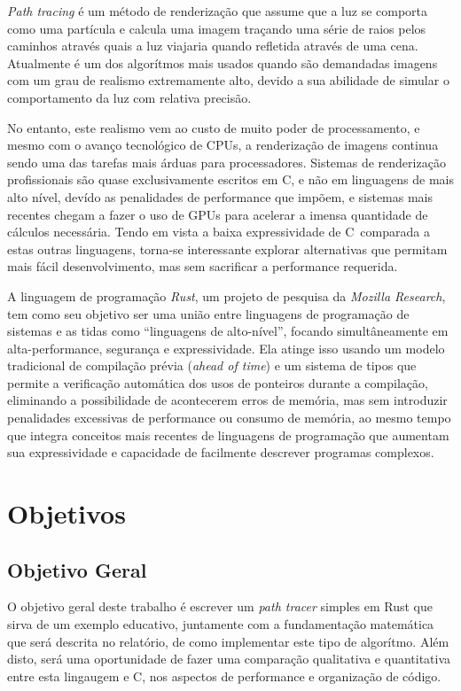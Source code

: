 \documentclass[12pt]{article}
\def\Cpp{{C\nolinebreak[4]\raisebox{.20ex}{\small\bf++}}}
\begin{document}
\emph{Path tracing} é um método de renderização que assume que a luz se comporta como uma partícula
e calcula uma imagem traçando uma série de raios pelos caminhos através quais a luz viajaria quando
refletida através de uma cena. Atualmente é um dos algorítmos mais usados quando são demandadas
imagens com um grau de realismo extremamente alto, devido a sua abilidade de simular o comportamento
da luz com relativa precisão.

No entanto, este realismo vem ao custo de muito poder de processamento, e mesmo com o avanço
tecnológico de CPUs, a renderização de imagens continua sendo uma das tarefas mais árduas para
processadores. Sistemas de renderização profissionais são quase exclusivamente escritos em \Cpp, e
não em linguagens de mais alto nível, devído as penalidades de performance que impõem, e sistemas
mais recentes chegam a fazer o uso de GPUs para acelerar a imensa quantidade de cálculos necessária.
Tendo em vista a baixa expressividade de \Cpp\ comparada a estas outras linguagens, torna-se
interessante explorar alternativas que permitam mais fácil desenvolvimento, mas sem sacrificar a
performance requerida.

A linguagem de programação \emph{Rust}, um projeto de pesquisa da \emph{Mozilla Research}, tem como
seu objetivo ser uma união entre linguagens de programação de sistemas e as tidas como ``linguagens
de alto-nível'', focando simultâneamente em alta-performance, segurança e expressividade. Ela atinge
isso usando um modelo tradicional de compilação prévia (\emph{ahead of time}) e um sistema de tipos
que permite a verificação automática dos usos de ponteiros durante a compilação, eliminando a
possibilidade de acontecerem erros de memória, mas sem introduzir penalidades excessivas de
performance ou consumo de memória, ao mesmo tempo que integra conceitos mais recentes de linguagens
de programação que aumentam sua expressividade e capacidade de facilmente descrever programas
complexos.

\section{Objetivos}

\subsection{Objetivo Geral}

O objetivo geral deste trabalho é escrever um \emph{path tracer} simples em Rust que sirva de um
exemplo educativo, juntamente com a fundamentação matemática que será descrita no relatório, de como
implementar este tipo de algorítmo. Além disto, será uma oportunidade de fazer uma comparação
qualitativa e quantitativa entre esta lingaugem e \Cpp, nos aspectos de performance e organização de
código.
\end{document}
